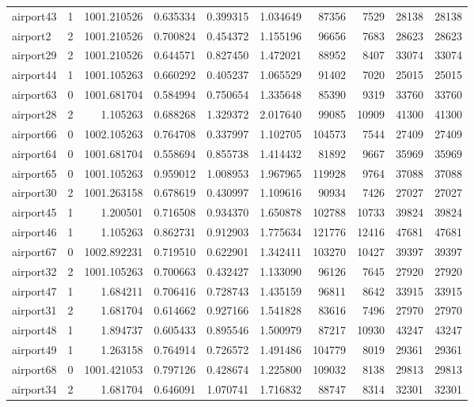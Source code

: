 \documentclass[../../../thesis.tex]{subfiles}
\begin{document}
\begin{longtable}{|l|r|r|r|r|r|r|r|r|r|}
airport43 & 1 & 1001.210526 & 0.635334 & 0.399315 & 1.034649 & 87356 & 7529 & 28138 & 28138 \\
airport2 & 2 & 1001.210526 & 0.700824 & 0.454372 & 1.155196 & 96656 & 7683 & 28623 & 28623 \\
airport29 & 2 & 1001.210526 & 0.644571 & 0.827450 & 1.472021 & 88952 & 8407 & 33074 & 33074 \\
airport44 & 1 & 1001.105263 & 0.660292 & 0.405237 & 1.065529 & 91402 & 7020 & 25015 & 25015 \\
airport63 & 0 & 1001.681704 & 0.584994 & 0.750654 & 1.335648 & 85390 & 9319 & 33760 & 33760 \\
airport28 & 2 & 1.105263 & 0.688268 & 1.329372 & 2.017640 & 99085 & 10909 & 41300 & 41300 \\
airport66 & 0 & 1002.105263 & 0.764708 & 0.337997 & 1.102705 & 104573 & 7544 & 27409 & 27409 \\
airport64 & 0 & 1001.681704 & 0.558694 & 0.855738 & 1.414432 & 81892 & 9667 & 35969 & 35969 \\
airport65 & 0 & 1001.105263 & 0.959012 & 1.008953 & 1.967965 & 119928 & 9764 & 37088 & 37088 \\
airport30 & 2 & 1001.263158 & 0.678619 & 0.430997 & 1.109616 & 90934 & 7426 & 27027 & 27027 \\
airport45 & 1 & 1.200501 & 0.716508 & 0.934370 & 1.650878 & 102788 & 10733 & 39824 & 39824 \\
airport46 & 1 & 1.105263 & 0.862731 & 0.912903 & 1.775634 & 121776 & 12416 & 47681 & 47681 \\
airport67 & 0 & 1002.892231 & 0.719510 & 0.622901 & 1.342411 & 103270 & 10427 & 39397 & 39397 \\
airport32 & 2 & 1001.105263 & 0.700663 & 0.432427 & 1.133090 & 96126 & 7645 & 27920 & 27920 \\
airport47 & 1 & 1.684211 & 0.706416 & 0.728743 & 1.435159 & 96811 & 8642 & 33915 & 33915 \\
airport31 & 2 & 1.681704 & 0.614662 & 0.927166 & 1.541828 & 83616 & 7496 & 27970 & 27970 \\
airport48 & 1 & 1.894737 & 0.605433 & 0.895546 & 1.500979 & 87217 & 10930 & 43247 & 43247 \\
airport49 & 1 & 1.263158 & 0.764914 & 0.726572 & 1.491486 & 104779 & 8019 & 29361 & 29361 \\
airport68 & 0 & 1001.421053 & 0.797126 & 0.428674 & 1.225800 & 109032 & 8138 & 29813 & 29813 \\
airport34 & 2 & 1.681704 & 0.646091 & 1.070741 & 1.716832 & 88747 & 8314 & 32301 & 32301 \\

\end{longtable}
\end{document}
